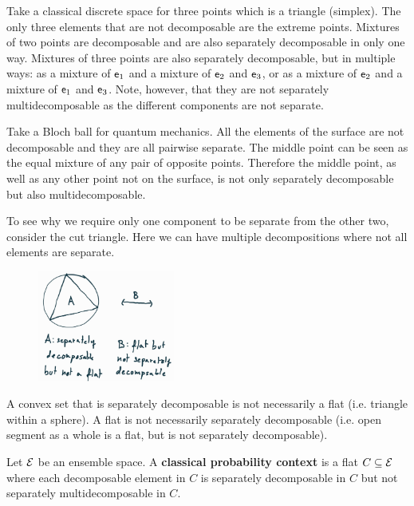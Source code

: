 \begin{remark}
	Take a classical discrete space for three points which is a triangle (simplex). The only three elements that are not decomposable are the extreme points. Mixtures of two points are decomposable and are also separately decomposable in only one way. Mixtures of three points are also separately decomposable, but in multiple ways: as a mixture of $\mathsf{e}_1$ and a mixture of $\mathsf{e}_2$ and $\mathsf{e}_3$, or as a mixture of $\mathsf{e}_2$ and a mixture of $\mathsf{e}_1$ and $\mathsf{e}_3$. Note, however, that they are not separately multidecomposable as the different components are not separate.
	
	Take a Bloch ball for quantum mechanics. All the elements of the surface are not decomposable and they are all pairwise separate. The middle point can be seen as the equal mixture of any pair of opposite points. Therefore the middle point, as well as any other point not on the surface, is not only separately decomposable but also multidecomposable.
	
	To see why we require only one component to be separate from the other two, consider the cut triangle. Here we can have multiple decompositions where not all elements are separate.
\end{remark}

\begin{figure}[h]
	\centering
	\includegraphics[width=0.4\textwidth]{tempimages/SeparableButNotFlat.jpg}
\end{figure}

\begin{remark}
	A convex set that is separately decomposable is not necessarily a flat (i.e. triangle within a sphere). A flat is not necessarily separately decomposable (i.e. open segment as a whole is a flat, but is not separately decomposable).
\end{remark}

\begin{defn}
	Let $\mathcal{E}$ be an ensemble space. A \textbf{classical probability context} is a flat $C \subseteq \mathcal{E}$ where each decomposable element in $C$ is separately decomposable in $C$ but not separately multidecomposable in $C$.
\end{defn}

